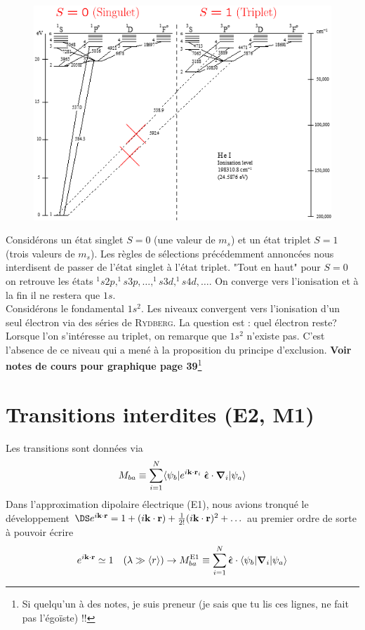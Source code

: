 	\begin{figure}
	\includegraphics[scale=0.4]{ch2/image5}
	\end{figure}

Considérons un état singlet $S=0$ (une valeur de $m_s$) et un état triplet $S=1$ (trois valeurs de
$m_s$). Les règles de sélections précédemment annoncées nous interdisent de passer de l'état 
singlet à l'état triplet. "Tout en haut" pour $S=0$ on retrouve les états $^1s2p, ^1s3p,\dots, ^1s3d,
 ^1s4d,\dots$. On converge vers l'ionisation et à la fin il ne restera que $1s$.\\
 
Considérons le fondamental $1s^2$. Les niveaux convergent vers l'ionisation d'un seul électron
via des séries de \textsc{Rydberg}. La question est : quel électron reste? Lorsque l'on s'intéresse
au triplet, on remarque que $1s^2$ n'existe pas. C'est l'absence de ce niveau qui a mené à la 
proposition du principe d'exclusion. \textbf{Voir notes de cours pour graphique page 39}\footnote{Si
quelqu'un à des notes, je suis preneur (je sais que tu lis ces lignes, ne fait pas l'égoïste) !!}


\section{Transitions interdites (E2, M1)}
Les transitions sont données via 
\begin{equation}
M_{ba} \equiv 
 \sum_{i= 1}^N 
 \langle \psi_b \vert 
e^{i {\bf k} \cdot {\bf r}_i } \; 
  \hat{  \mbox{\boldmath $ \epsilon $}} \cdot 
\mbox{\boldmath $ \nabla $} _i \vert \psi_a \rangle
\end{equation}
Dans l'approximation dipolaire électrique (E1), nous avions tronqué le développement 
$\DS e^{i {\bf k} \cdot {\bf r} } = 1 + (i {\bf k} \cdot {\bf r} ) + \frac{1}{2!} 
  ( i {\bf k} \cdot {\bf r} ) ^2 + \ldots$ au premier ordre de sorte à pouvoir écrire
\begin{equation}
  e^{i {\bf k} \cdot {\bf r} } \simeq 1 
~~~ (\lambda \gg \langle r \rangle )
\rightarrow 
M_{ba} ^{\rm{ E1}} \equiv 
 \sum_{i= 1}^N 
\hat{  \mbox{\boldmath $ \epsilon $}}    \cdot 
 \langle \psi_b \vert 
\mbox{\boldmath $ \nabla $} _i \vert \psi_a \rangle
\end{equation}

